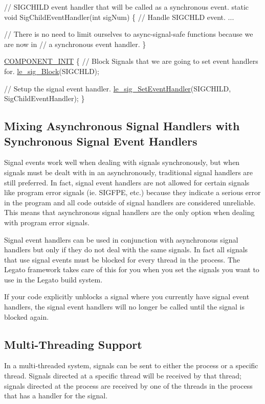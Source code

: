 \begin{DoxyCode}
\textcolor{comment}{// SIGCHILD event handler that will be called as a synchronous event.}
\textcolor{keyword}{static} \textcolor{keywordtype}{void} SigChildEventHandler(\textcolor{keywordtype}{int} sigNum)
\{
     \textcolor{comment}{// Handle SIGCHLD event.}
     ...

     \textcolor{comment}{// There is no need to limit ourselves to async-signal-safe functions because we are now in}
     \textcolor{comment}{// a synchronous event handler.}
\}


\hyperlink{le__event_loop_8h_abdb9187a56836a93d19cc793cbd4b7ec}{COMPONENT\_INIT}
\{
     \textcolor{comment}{// Block Signals that we are going to set event handlers for.}
     \hyperlink{le__signals_8h_a095ec12deab6b6ed0475583586a6c4d7}{le\_sig\_Block}(SIGCHLD);

     \textcolor{comment}{// Setup the signal event handler.}
     \hyperlink{le__signals_8h_a421910132f193dae70e8309dc86a86c4}{le\_sig\_SetEventHandler}(SIGCHILD, SigChildEventHandler);
\}
\end{DoxyCode}
\hypertarget{c_signals_c_signals_mixedHandlers}{}\subsection{Mixing Asynchronous Signal Handlers with Synchronous Signal Event Handlers}\label{c_signals_c_signals_mixedHandlers}
Signal events work well when dealing with signals synchronously, but when signals must be dealt with in an asynchronously, traditional signal handlers are still preferred. In fact, signal event handlers are not allowed for certain signals like program error signals (ie. S\+I\+G\+F\+P\+E, etc.) because they indicate a serious error in the program and all code outside of signal handlers are considered unreliable. This means that asynchronous signal handlers are the only option when dealing with program error signals.

Signal event handlers can be used in conjunction with asynchronous signal handlers but only if they do not deal with the same signals. In fact all signals that use signal events must be blocked for every thread in the process. The Legato framework takes care of this for you when you set the signals you want to use in the Legato build system.

If your code explicitly unblocks a signal where you currently have signal event handlers, the signal event handlers will no longer be called until the signal is blocked again.\hypertarget{c_signals_c_signals_multiThread}{}\subsection{Multi-\/\+Threading Support}\label{c_signals_c_signals_multiThread}
In a multi-\/threaded system, signals can be sent to either the process or a specific thread. Signals directed at a specific thread will be received by that thread; signals directed at the process are received by one of the threads in the process that has a handler for the signal.

